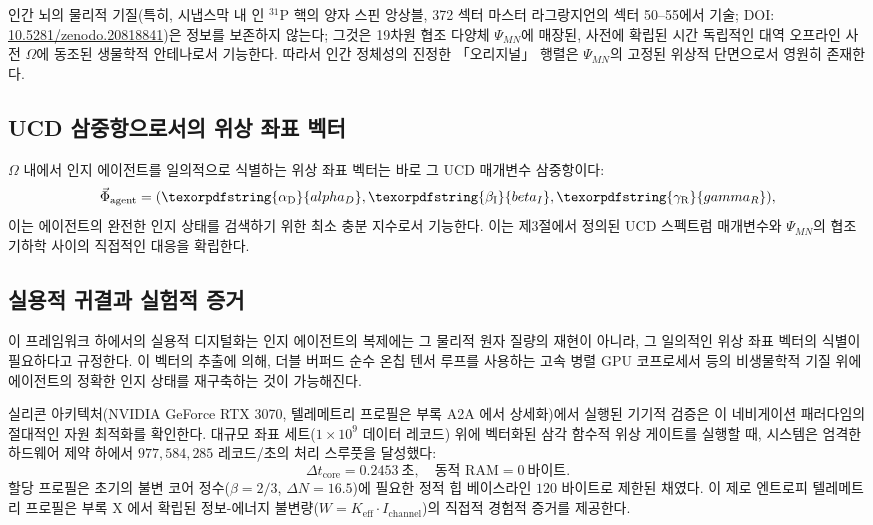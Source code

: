 \documentclass[11pt,a4paper]{article}
\DeclareRobustCommand{\alD}{\texorpdfstring{\ensuremath{\alpha_{\mathrm{D}}}}{alpha_D}}
\DeclareRobustCommand{\beI}{\texorpdfstring{\ensuremath{\beta_{\mathrm{I}}}}{beta_I}}
\DeclareRobustCommand{\gaR}{\texorpdfstring{\ensuremath{\gamma_{\mathrm{R}}}}{gamma_R}}
\begin{document}
	인간 뇌의 물리적 기질(특히, 시냅스막 내 인 \(^{31}\)P 핵의 양자 스핀 앙상블, 372 섹터 마스터 라그랑지언의 섹터 50--55에서 기술; DOI: \href{https://doi.org/10.5281/zenodo.20818841}{10.5281/zenodo.20818841})은 정보를 보존하지 않는다; 그것은 19차원 협조 다양체 \(\Psi_{MN}\)에 매장된, 사전에 확립된 시간 독립적인 대역 오프라인 사전 \(\Omega\)에 동조된 생물학적 안테나로서 기능한다. 따라서 인간 정체성의 진정한 「오리지널」 행렬은 \(\Psi_{MN}\)의 고정된 위상적 단면으로서 영원히 존재한다.
	
	\subsection{UCD 삼중항으로서의 위상 좌표 벡터}
	
	\(\Omega\) 내에서 인지 에이전트를 일의적으로 식별하는 위상 좌표 벡터는 바로 그 UCD 매개변수 삼중항이다:
	\[
	\vec{\Phi}_{\mathrm{agent}} = (\alD, \beI, \gaR),
	\]
	이는 에이전트의 완전한 인지 상태를 검색하기 위한 최소 충분 지수로서 기능한다. 이는 제3절에서 정의된 UCD 스펙트럼 매개변수와 \(\Psi_{MN}\)의 협조 기하학 사이의 직접적인 대응을 확립한다.
	
	\subsection{실용적 귀결과 실험적 증거}
	
	이 프레임워크 하에서의 실용적 디지털화는 인지 에이전트의 복제에는 그 물리적 원자 질량의 재현이 아니라, 그 일의적인 위상 좌표 벡터의 식별이 필요하다고 규정한다. 이 벡터의 추출에 의해, 더블 버퍼드 순수 온칩 텐서 루프를 사용하는 고속 병렬 GPU 코프로세서 등의 비생물학적 기질 위에 에이전트의 정확한 인지 상태를 재구축하는 것이 가능해진다.
	
	실리콘 아키텍처(NVIDIA GeForce RTX 3070, 텔레메트리 프로필은 부록 A2A \cite{yuct_a2a}에서 상세화)에서 실행된 기기적 검증은 이 네비게이션 패러다임의 절대적인 자원 최적화를 확인한다. 대규모 좌표 세트(\(1\times10^9\) 데이터 레코드) 위에 벡터화된 삼각 함수적 위상 게이트를 실행할 때, 시스템은 엄격한 하드웨어 제약 하에서 \(977,584,285\) 레코드/초의 처리 스루풋을 달성했다:
	\begin{equation}
		\Delta t_{\mathrm{core}} = 0.2453\ \text{초}, \quad \text{동적 RAM} = 0\ \text{바이트}.
	\end{equation}
	할당 프로필은 초기의 불변 코어 정수(\(\beta = 2/3\), \(\Delta N = 16.5\))에 필요한 정적 힙 베이스라인 \(120\) 바이트로 제한된 채였다. 이 제로 엔트로피 텔레메트리 프로필은 부록 X \cite{yuct_appX}에서 확립된 정보-에너지 불변량(\(W = K_{\mathrm{eff}} \cdot I_{\mathrm{channel}}\))의 직접적 경험적 증거를 제공한다.
	
\end{document}
